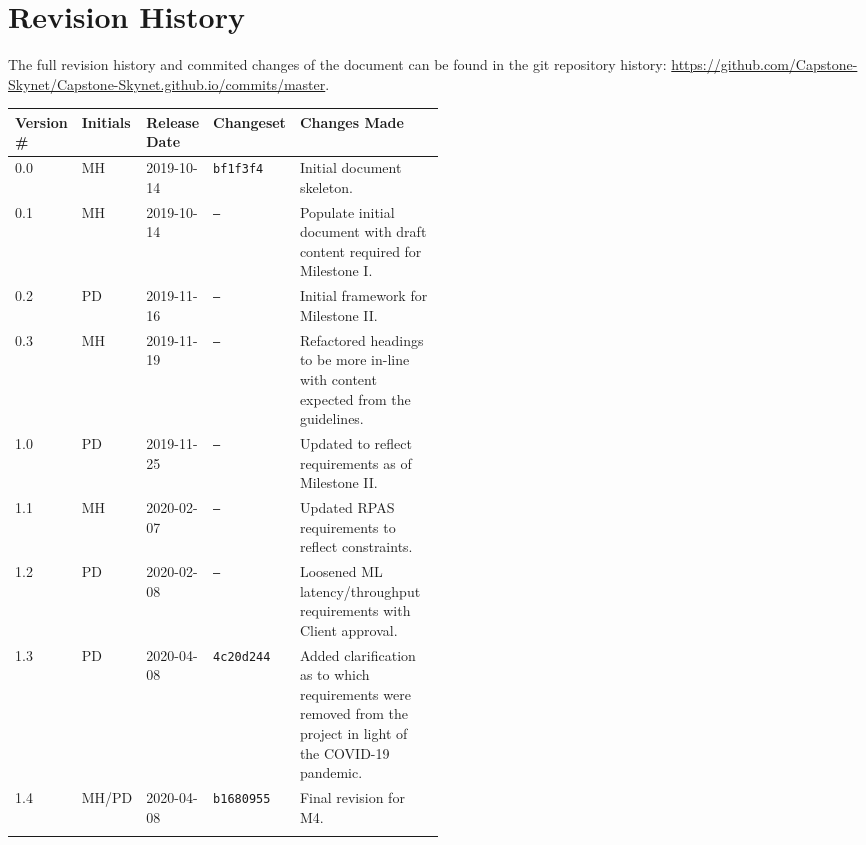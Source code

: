 \section*{Revision History}
The full revision history and commited changes of the document can be found in the git repository history: \href{https://github.com/Capstone-Skynet/Capstone-Skynet.github.io}{https://github.com/Capstone-Skynet/Capstone-Skynet.github.io/commits/master}.

\begin{table}[H]
\begin{tabular}{*{4}{l}p{0.5\linewidth}}
\hline
Version \# & Initials & Release Date & Changeset & Changes Made \\ \hline

0.0 & MH & 2019-10-14 & \texttt{bf1f3f4} & Initial document skeleton.\\
0.1 & MH & 2019-10-14 & \texttt{--} & Populate initial document with draft content required for Milestone I.\\
0.2 & PD & 2019-11-16 & \texttt{--} & Initial framework for Milestone II.\\
0.3 & MH & 2019-11-19 & \texttt{--} & Refactored headings to be more in-line with content expected from the guidelines.\\
1.0 & PD & 2019-11-25 & \texttt{--} & Updated to reflect requirements as of Milestone II.\\
1.1 & MH & 2020-02-07 & \texttt{--} & Updated RPAS requirements to reflect constraints.\\
1.2 & PD & 2020-02-08 & \texttt{--} & Loosened ML latency/throughput requirements with Client approval.\\
1.3 & PD & 2020-04-08 & \texttt{4c20d244} & Added clarification as to which requirements were removed from the project in light of the COVID-19 pandemic.\\
1.4 & MH/PD & 2020-04-08 & \texttt{b1680955} & Final revision for M4.\\
 & & & \\ \hline
\end{tabular}
\end{table}
